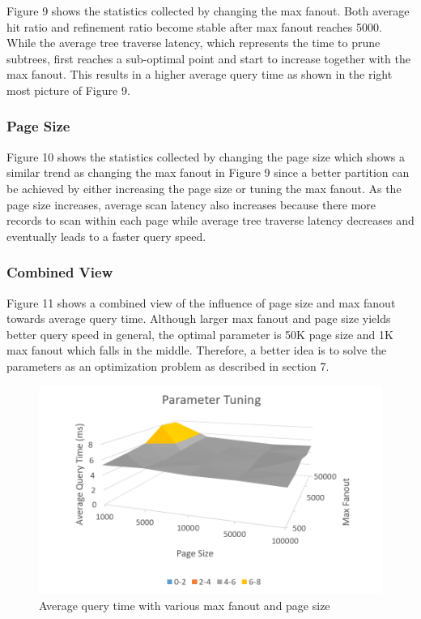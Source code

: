 \documentclass[sigconf,10pt]{acmart}
\begin{document}
Figure 9 shows the statistics collected by changing the max fanout. Both average
hit ratio and refinement ratio become stable after max fanout reaches 5000. While
the average tree traverse latency, which represents the time to prune subtrees,
first reaches a sub-optimal point and start to increase together with the max fanout.
This results in a higher average query time as shown in the right most picture of Figure 9.

\subsubsection{Page Size}

Figure 10 shows the statistics collected by changing the page size which shows
a similar trend as changing the max fanout in Figure 9 since a better partition
can be achieved by either increasing the page size or tuning the max fanout. As
the page size increases, average scan latency also increases because there more
records to scan within each page while average tree traverse latency decreases
and eventually leads to a faster query speed.

\subsubsection{Combined View}

Figure 11 shows a combined view of the influence of page size and max fanout towards
average query time. Although larger max fanout and page size yields better query speed
in general, the optimal parameter is 50K page size and 1K max fanout which falls in
the middle. Therefore, a better idea is to solve the parameters as an optimization
problem as described in section 7.

\begin{figure}
  \includegraphics[scale=0.6]{../figures/parameter/avg-qtime-3D2}
  \caption{Average query time with various max fanout and page size}
  \label{combined-view}
\end{figure}
\end{document}
